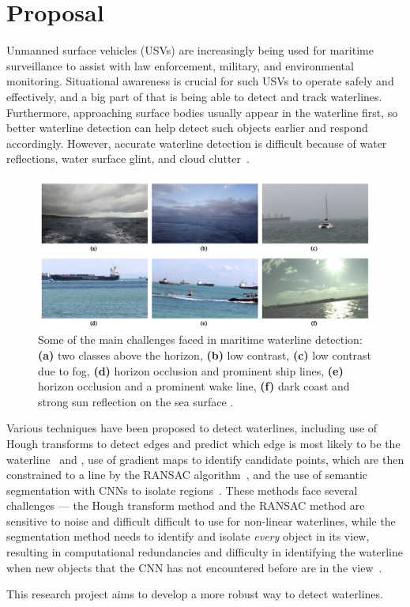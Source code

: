 \section*{Proposal}

Unmanned surface vehicles (USVs) are increasingly being used for maritime surveillance
to assist with law enforcement, military, and environmental monitoring.
Situational awareness is crucial for such USVs to operate safely and effectively,
and a big part of that is being able to detect and track waterlines.
Furthermore, approaching surface bodies usually appear in the waterline first,
so better waterline detection can help detect such objects earlier and
respond accordingly.
However, accurate waterline detection is difficult because of water reflections,
water surface glint, and cloud clutter~\cite{zhan-2017}.

\begin{figure}[h!]
  \includegraphics[width=\textwidth]{challenging-maritime-landscapes.png}
  \caption{
    Some of the main challenges faced in maritime waterline detection:
    \textbf{(a)} two classes above the horizon,
    \textbf{(b)} low contrast,
    \textbf{(c)} low contrast due to fog,
    \textbf{(d)} horizon occlusion and prominent ship lines,
    \textbf{(e)} horizon occlusion and a prominent wake line,
    \textbf{(f)} dark coast and strong sun reflection on the sea surface
    \cite{zardoua-2021}.
  }
\end{figure}
Various techniques have been proposed to detect waterlines,
including use of Hough transforms to detect edges and predict which edge
is most likely to be the waterline~\cite{gao-2007} and \cite{prasad-2017},
use of gradient maps to identify candidate points, which are then constrained
to a line by the \textsc{RANSAC} algorithm~\cite{zhan-2017},
and the use of semantic segmentation with CNNs to isolate regions~\cite{bovcon-2020}.
These methods face several challenges ---
the Hough transform method and the \textsc{RANSAC} method are sensitive to noise
and difficult difficult to use for non-linear waterlines,
while the segmentation method needs to identify and isolate
\emph{every} object in its view, resulting in computational redundancies
and difficulty in identifying the waterline when new objects that the CNN
has not encountered before are in the view~\cite{bovcon-2020}.

\step
This research project aims to develop a more robust way to detect waterlines.
